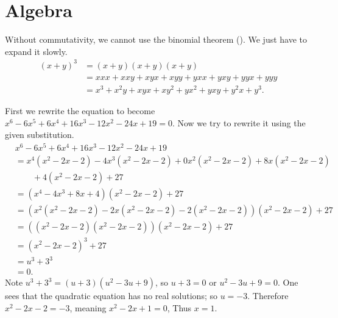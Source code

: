 \section{Algebra}
\begin{questions}
    \item Without commutativity, we cannot use the binomial theorem (). We just have to expand it slowly.
    \begin{align*}
        (x+y)^3 &= (x+y)(x+y)(x+y)\\
        &= xxx + xxy + xyx + xyy + yxx + yxy + yyx + yyy\\
        &= x^3 + x^2y + xyx + xy^2 + yx^2 + yxy + y^2x + y^3.
    \end{align*}

    \item First we rewrite the equation to become $x^6 - 6x^5 + 6x^4 + 16x^3 - 12x^2 - 24x + 19 = 0$. Now we try to rewrite it using the given substitution.
    \begin{align*}
        &x^6 - 6x^5 + 6x^4 + 16x^3 - 12x^2 - 24x + 19\\
        &=x^4(x^2-2x-2) - 4x^3(x^2-2x-2) + 0x^2(x^2-2x-2) + 8x(x^2-2x-2)\\
        &\quad\quad+ 4(x^2-2x-2) + 27\\
        &= (x^4-4x^3+8x+4)(x^2-2x-2) + 27\\
        &= (x^2(x^2-2x-2) - 2x(x^2-2x-2) - 2(x^2-2x-2))(x^2-2x-2) + 27\\
        &= ((x^2-2x-2)(x^2-2x-2))(x^2-2x-2)+27\\
        &= (x^2-2x-2)^3 + 27\\
        &= u^3 + 3^3\\
        &= 0.
    \end{align*}
    Note $u^3 + 3^3 = (u+3)(u^2 - 3u + 9)$, so $u+3 = 0$ or $u^2 - 3u + 9 = 0$. One sees that the quadratic equation has no real solutions; so $u = -3$. Therefore $x^2 - 2x - 2 = -3$, meaning $x^2-2x+1 = 0$, Thus $x = 1$.


\end{questions}
